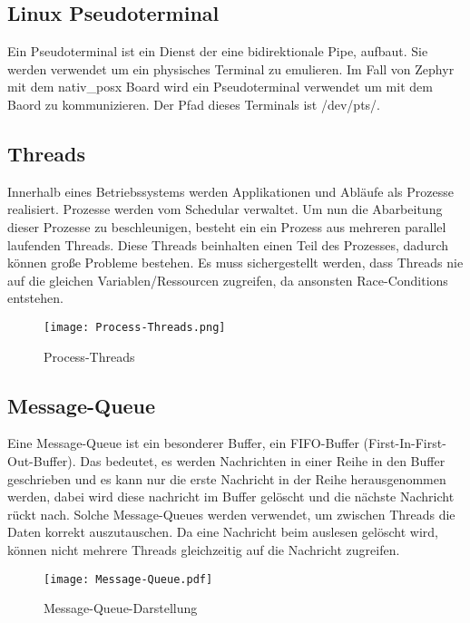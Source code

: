      
\subsection{Linux Pseudoterminal}
Ein Pseudoterminal ist ein Dienst der eine bidirektionale Pipe, aufbaut. Sie werden verwendet um ein physisches Terminal zu emulieren. 
Im Fall von Zephyr mit dem nativ\_posx Board wird ein Pseudoterminal verwendet um mit dem Baord zu kommunizieren. Der Pfad dieses Terminals ist /dev/pts/.
\subsection{Threads}
Innerhalb eines Betriebssystems werden Applikationen und Abläufe als Prozesse realisiert. Prozesse werden vom Schedular verwaltet. Um nun die Abarbeitung dieser Prozesse zu 
beschleunigen, besteht ein ein Prozess aus mehreren parallel laufenden Threads. Diese Threads beinhalten einen Teil des Prozesses, dadurch können große Probleme bestehen. 
Es muss sichergestellt werden, dass Threads nie auf die gleichen Variablen/Ressourcen zugreifen, da ansonsten Race-Conditions entstehen. 
\begin{figure}[!htb]
    \centering
    \texttt{[image: Process-Threads.png]}
    \caption{Process-Threads}
    \label{caption:Process-Threads}
\end{figure}

\newpage
\subsection{Message-Queue}
Eine Message-Queue ist ein besonderer Buffer, ein FIFO-Buffer (First-In-First-Out-Buffer). Das bedeutet, es werden Nachrichten in einer Reihe in den Buffer geschrieben und es kann nur die
erste Nachricht in der Reihe herausgenommen werden, dabei wird diese nachricht im Buffer gelöscht und die nächste Nachricht rückt nach. 
Solche Message-Queues werden verwendet, um zwischen Threads die Daten korrekt auszutauschen. Da eine Nachricht beim auslesen gelöscht wird, können nicht mehrere Threads gleichzeitig auf 
die Nachricht zugreifen. 
\begin{figure}[!ht]
    \centering
    \texttt{[image: Message-Queue.pdf]}
    \caption{Message-Queue-Darstellung}
    \label{fig:Message-Queue-Darstellung}
\end{figure}